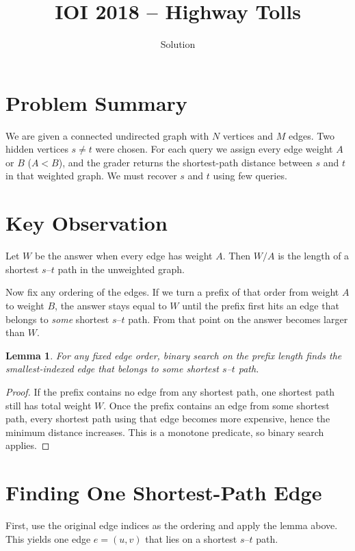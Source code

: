 \documentclass[11pt,a4paper]{article}
\title{IOI 2018 -- Highway Tolls}
\author{Solution}
\date{}
\newtheorem{lemma}{Lemma}
\begin{document}
\maketitle

\section{Problem Summary}

We are given a connected undirected graph with $N$ vertices and $M$ edges.
Two hidden vertices $s \neq t$ were chosen. For each query we assign every
edge weight $A$ or $B$ ($A < B$), and the grader returns the shortest-path
distance between $s$ and $t$ in that weighted graph. We must recover $s$ and
$t$ using few queries.

\section{Key Observation}

Let $W$ be the answer when every edge has weight $A$. Then $W/A$ is the
length of a shortest $s$--$t$ path in the unweighted graph.

Now fix any ordering of the edges. If we turn a prefix of that order from
weight $A$ to weight $B$, the answer stays equal to $W$ until the prefix first
hits an edge that belongs to \emph{some} shortest $s$--$t$ path. From that point
on the answer becomes larger than $W$.

\begin{lemma}
For any fixed edge order, binary search on the prefix length finds the
smallest-indexed edge that belongs to some shortest $s$--$t$ path.
\end{lemma}

\begin{proof}
If the prefix contains no edge from any shortest path, one shortest path still
has total weight $W$. Once the prefix contains an edge from some shortest
path, every shortest path using that edge becomes more expensive, hence the
minimum distance increases. This is a monotone predicate, so binary search
applies.
\end{proof}

\section{Finding One Shortest-Path Edge}

First, use the original edge indices as the ordering and apply the lemma above.
This yields one edge $e = (u, v)$ that lies on a shortest $s$--$t$ path.
\end{document}
